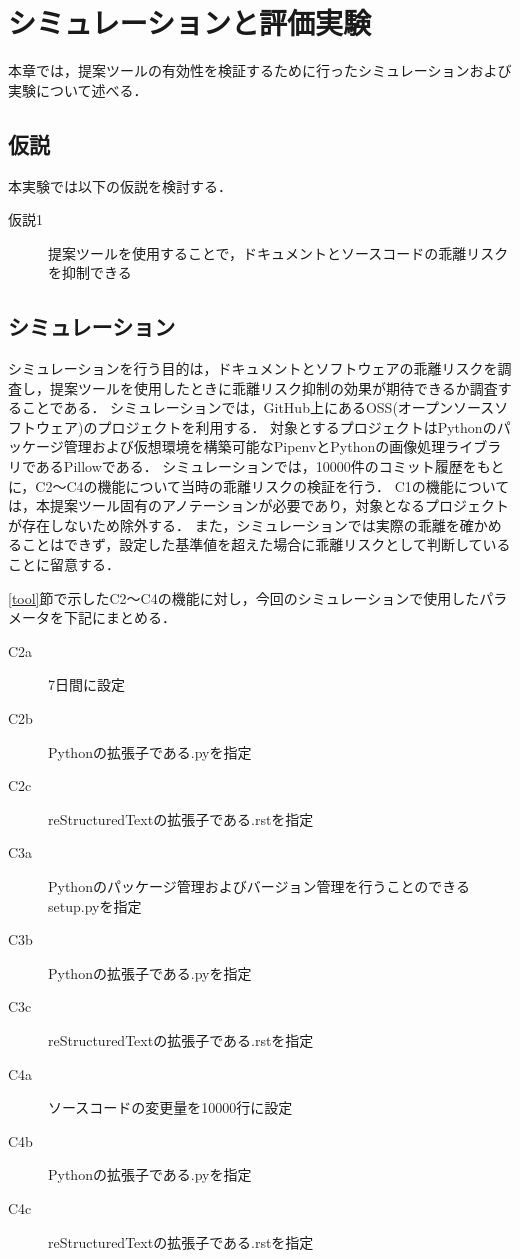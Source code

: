 \chapter{シミュレーションと評価実験}
本章では，提案ツールの有効性を検証するために行ったシミュレーションおよび実験について述べる．

\section{仮説}
本実験では以下の仮説を検討する．

\begin{description}
    \item[仮説1] 提案ツールを使用することで，ドキュメントとソースコードの乖離リスクを抑制できる
\end{description}

\section{シミュレーション}
\label{sim}
シミュレーションを行う目的は，ドキュメントとソフトウェアの乖離リスクを調査し，提案ツールを使用したときに乖離リスク抑制の効果が期待できるか調査することである．
シミュレーションでは，GitHub上にあるOSS(オープンソースソフトウェア)のプロジェクトを利用する．
対象とするプロジェクトはPythonのパッケージ管理および仮想環境を構築可能なPipenv\cite{pipenv}とPythonの画像処理ライブラリであるPillow\cite{pillow}である．
シミュレーションでは，10000件のコミット履歴をもとに，C2〜C4の機能について当時の乖離リスクの検証を行う．
C1の機能については，本提案ツール固有のアノテーションが必要であり，対象となるプロジェクトが存在しないため除外する．
また，シミュレーションでは実際の乖離を確かめることはできず，設定した基準値を超えた場合に乖離リスクとして判断していることに留意する．

\ref{tool}節で示したC2〜C4の機能に対し，今回のシミュレーションで使用したパラメータを下記にまとめる．
\begin{description}
    \item[C2a] 7日間に設定
    \item[C2b] Pythonの拡張子である.pyを指定
    \item[C2c] reStructuredTextの拡張子である.rstを指定 
    \item[C3a] Pythonのパッケージ管理およびバージョン管理を行うことのできるsetup.pyを指定
    \item[C3b] Pythonの拡張子である.pyを指定
    \item[C3c] reStructuredTextの拡張子である.rstを指定
    \item[C4a] ソースコードの変更量を10000行に設定
    \item[C4b] Pythonの拡張子である.pyを指定
    \item[C4c] reStructuredTextの拡張子である.rstを指定
\end{description}


